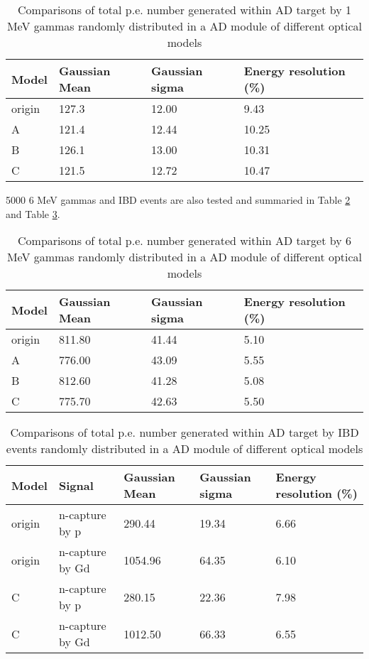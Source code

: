 \begin{table}
\centering
\caption{Comparisons of total p.e. number generated within AD target by 1 MeV gammas randomly distributed in a AD module of different optical models}
\label{tab:peGenGdLSOpModel}
\begin{tabular}{lp{3.0cm}p{3.0cm}p{3.0cm}}
Model  &  Gaussian Mean  &  Gaussian sigma &     Energy resolution (\%) \\
\hline
\hline
origin  & 127.3 & 12.00 & 9.43 \\
A       & 121.4 & 12.44 & 10.25 \\
B       & 126.1 & 13.00 & 10.31 \\
C       & 121.5 & 12.72 & 10.47 \\
\hline
\end{tabular}
\end{table}


5000 6 MeV gammas and IBD events are also tested and summaried in Table \ref{tab:peGenGdLSOpModel6mevGamma} and Table \ref{tab:peGenGdLSOpModelIBD}.


\begin{table}
\centering
\caption{Comparisons of total p.e. number generated within AD target by 6 MeV gammas randomly distributed in a AD module of different optical models}
\label{tab:peGenGdLSOpModel6mevGamma}
\begin{tabular}{lp{3.0cm}p{3.0cm}p{3.0cm}}
Model  &  Gaussian Mean  &  Gaussian sigma &     Energy resolution (\%) \\
\hline
\hline
origin  & 811.80 & 41.44 & 5.10 \\
A       & 776.00 & 43.09 & 5.55 \\
B       & 812.60 & 41.28 & 5.08 \\
C       & 775.70 & 42.63 & 5.50 \\
\hline
\end{tabular}
\end{table}


\begin{table}
\centering
\caption{Comparisons of total p.e. number generated within AD target by IBD events randomly distributed in a AD module of different optical models}
\label{tab:peGenGdLSOpModelIBD}
\begin{tabular}{lp{3.0cm}p{3.0cm}p{3.0cm}p{3.0cm}}
Model & Signal &  Gaussian Mean  &  Gaussian sigma &     Energy resolution (\%) \\
\hline
\hline
origin  & n-capture by p    & 290.44  & 19.34 & 6.66 \\
origin  & n-capture by Gd   & 1054.96   & 64.35 &   6.10\\
C       & n-capture by p    & 280.15    & 22.36 & 7.98 \\
C       & n-capture by Gd   & 1012.50   & 66.33 & 6.55 \\
\hline
\end{tabular}
\end{table}


